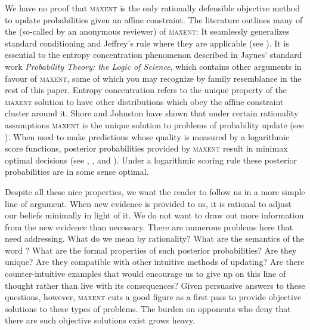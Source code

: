 \documentclass[12pt]{article}
\begin{document}
We have no proof that \textsc{maxent} is the only rationally
defensible objective method to update probabilities given an affine
constraint. The literature outlines many of the  (so-called by an anonymous reviewer) of \textsc{maxent}:
It seamlessly generalizes standard conditioning and Jeffrey's rule
where they are applicable (see ). It is
essential to the entropy concentration phenomenon described in Jaynes'
standard work \emph{Probability Theory: the Logic of Science}, which
contains other arguments in favour of \textsc{maxent}, some of which
you may recognize by family resemblance in the rest of this paper.
Entropy concentration refers to the unique property of the
\textsc{maxent} solution to have other distributions which obey the
affine constraint cluster around it. Shore and Johnston have shown
that under certain rationality assumptions \textsc{maxent} is the
unique solution to problems of probability update (see
). When used to make predictions whose
quality is measured by a logarithmic score functions, posterior
probabilities provided by \textsc{maxent} result in minimax optimal
decisions (see , , and
). Under a logarithmic scoring rule these
posterior probabilities are in some sense optimal.

Despite all these nice properties, we want the reader to follow us in
a more simple line of argument. When new evidence is provided to us,
it is rational to adjust our beliefs minimally in light of it. We do
not want to draw out more information from the new evidence than
necessary. There are numerous problems here that need addressing. What
do we mean by rationality? What are the semantics of the word
? What are the formal properties of such posterior
probabilities? Are they unique? Are they compatible with other
intuitive methods of updating? Are there counter-intuitive examples
that would encourage us to give up on this line of thought rather than
live with its consequences? Given persuasive answers to these
questions, however, \textsc{maxent} cuts a good figure as a first pass
to provide objective solutions to these types of problems. The burden
on opponents who deny that there are such objective solutions exist
grows heavy.
\end{document}
